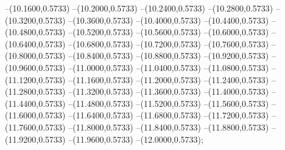 {	--(10.1600,0.5733)
	--(10.2000,0.5733)
	--(10.2400,0.5733)
	--(10.2800,0.5733)
	--(10.3200,0.5733)
	--(10.3600,0.5733)
	--(10.4000,0.5733)
	--(10.4400,0.5733)
	--(10.4800,0.5733)
	--(10.5200,0.5733)
	--(10.5600,0.5733)
	--(10.6000,0.5733)
	--(10.6400,0.5733)
	--(10.6800,0.5733)
	--(10.7200,0.5733)
	--(10.7600,0.5733)
	--(10.8000,0.5733)
	--(10.8400,0.5733)
	--(10.8800,0.5733)
	--(10.9200,0.5733)
	--(10.9600,0.5733)
	--(11.0000,0.5733)
	--(11.0400,0.5733)
	--(11.0800,0.5733)
	--(11.1200,0.5733)
	--(11.1600,0.5733)
	--(11.2000,0.5733)
	--(11.2400,0.5733)
	--(11.2800,0.5733)
	--(11.3200,0.5733)
	--(11.3600,0.5733)
	--(11.4000,0.5733)
	--(11.4400,0.5733)
	--(11.4800,0.5733)
	--(11.5200,0.5733)
	--(11.5600,0.5733)
	--(11.6000,0.5733)
	--(11.6400,0.5733)
	--(11.6800,0.5733)
	--(11.7200,0.5733)
	--(11.7600,0.5733)
	--(11.8000,0.5733)
	--(11.8400,0.5733)
	--(11.8800,0.5733)
	--(11.9200,0.5733)
	--(11.9600,0.5733)
	--(12.0000,0.5733);
}
